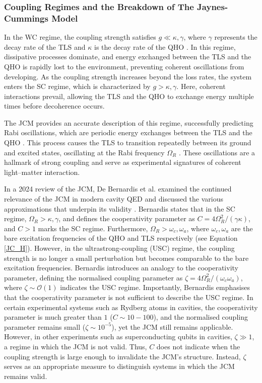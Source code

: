 \documentclass[12pt,a4paper]{article}
\begin{document}
\subsubsection{Coupling Regimes and the Breakdown of The Jaynes-Cummings Model}

In the WC regime, the coupling strength satisfies $g \ll \kappa, \gamma$, where $\gamma$ represents the decay rate of the TLS and $\kappa$ is the decay rate of the QHO \cite{Context2017-USC_failure}. In this regime, dissipative processes dominate, and energy exchanged between the TLS and the QHO is rapidly lost to the environment, preventing coherent oscillations from developing. As the coupling strength increases beyond the loss rates, the system enters the SC regime, which is characterized by $g > \kappa, \gamma$. Here, coherent interactions prevail, allowing the TLS and the QHO to exchange energy multiple times before decoherence occurs.

The JCM provides an accurate description of this regime, successfully predicting Rabi oscillations, which are periodic energy exchanges between the TLS and the QHO \cite{Context1993-JC_Verification}. This process causes the TLS to transition repeatedly between its ground and excited states, oscillating at the Rabi frequency $\Omega_R$ \cite{Context_-Rabi_oscillations}. These oscillations are a hallmark of strong coupling and serve as experimental signatures of coherent light–matter interaction.

In a 2024 review of the JCM, De Bernardis et al. examined the continued relevance of the JCM in modern cavity QED and discussed the various approximations that underpin its validity \cite{General2024-JCM_relevance}. Bernardis states that in the SC regime, $\Omega_R > \kappa, \gamma$, and defines the cooperativity parameter as $C = 4\Omega^{2}_R/(\gamma\kappa)$, and $C > 1$ marks the SC regime. Furthermore, $\Omega_R > \omega_c, \omega_a$, where $\omega_c, \omega_a$ are the bare excitation frequencies of the QHO and TLS respectively (see Equation \eqref{JC_H}). However, in the ultrastrong-coupling (USC) regime, the coupling strength is no longer a small perturbation but becomes comparable to the bare excitation frequencies. Bernardis introduces an analogy to the cooperativity parameter, defining the normalised coupling parameter as $\zeta = 4\Omega^{2}_R/(\omega_c\omega_a)$, where $\zeta \sim \mathcal{O}(1) $ indicates the USC regime. Importantly, Bernardis emphasises that the cooperativity parameter is not sufficient to describe the USC regime. In certain experimental systems such as Rydberg atoms in cavities, the cooperativity parameter is much greater than $1$ ($C \sim 10-100$), and the normalised coupling parameter remains small ($\zeta \sim 10^{-5} $), yet the JCM still remains applicable. However, in other experiments such as superconducting qubits in cavities, $\zeta \gg 1$, a regime in which the JCM is not valid. Thus, $C$ does not indicate when the coupling strength is large enough to invalidate the JCM’s structure. Instead, $\zeta$ serves as an appropriate measure to distinguish systems in which the JCM remains valid.\\
\end{document}
